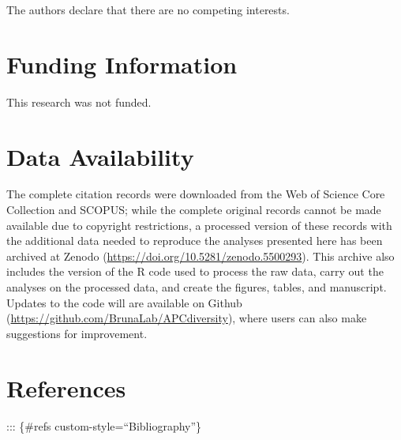 \documentclass[
  english,
  man]{apa6}
\begin{document}
The authors declare that there are no competing interests.

\hypertarget{funding-information}{%
\section{Funding Information}\label{funding-information}}

This research was not funded.

\hypertarget{data-availability}{%
\section{Data Availability}\label{data-availability}}

The complete citation records were downloaded from the Web of Science Core Collection and SCOPUS; while the complete original records cannot be made available due to copyright restrictions, a processed version of these records with the additional data needed to reproduce the analyses presented here has been archived at Zenodo (\url{https://doi.org/10.5281/zenodo.5500293}). This archive also includes the version of the R code used to process the raw data, carry out the analyses on the processed data, and create the figures, tables, and manuscript. Updates to the code will are available on Github (\url{https://github.com/BrunaLab/APCdiversity}), where users can also make suggestions for improvement.

\newpage

\hypertarget{references}{%
\section{References}\label{references}}

\begingroup
\setlength{\parindent}{-0.5in}
\setlength{\leftskip}{0.5in}

::: \{\#refs custom-style=``Bibliography''\}

\endgroup
\end{document}

